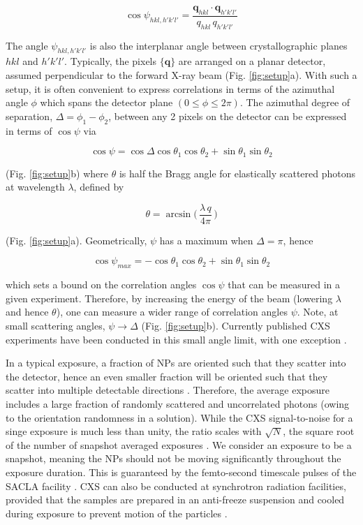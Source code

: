 \documentclass [12pt,fleqn]{article}
\def \be {\begin{equation}}
\def \ee {\end{equation}}
\begin{document}
\be \label{hklcorr}
\cos \psi_{hkl,h'k'l'}  =\frac{ \bm q_{hkl} \cdot \bm q_{h'k'l'} } {q_{hkl}\, q_{h'k'l'}} 
\ee

The angle $\psi_{hkl,h'k'l'}$ is also the interplanar angle between crystallographic planes $hkl$ and $h'k'l'$. Typically, the pixels $\{\bm q\}$ are arranged on a planar detector, assumed perpendicular to the forward X-ray beam (Fig. \ref{fig:setup}a). With such a setup, it is often convenient to express correlations in terms of the azimuthal angle $\phi$ which spans the detector plane $(0 \le \phi \le 2\pi)$. The azimuthal degree of separation, $\Delta = \phi_1  - \phi_2$, between any 2 pixels on the detector can be expressed in terms of $\cos \psi$ via

\be \label{project}
\cos \psi  = \cos  \Delta  \cos  \theta_1 \cos \theta_2 + \sin \theta_1 \sin \theta_2
\ee

(Fig. \ref{fig:setup}b) where $\theta$ is half the Bragg angle for elastically scattered photons at wavelength $\lambda$, defined by

\be
\theta  = \arcsin \big( \,\frac{ \lambda\,q  }{ 4\pi }\, \big )
\ee

(Fig. \ref{fig:setup}a). Geometrically, $\psi$ has a maximum when $\Delta=\pi$, hence

\be \label{psimax}
\cos \psi_{max} = - \cos \theta_1 \cos \theta_2  + \sin \theta_1 \sin \theta_2
\ee


which sets a bound on the correlation angles $\cos \psi$ that can be measured in a given experiment. Therefore, by increasing the energy of the beam (lowering $\lambda$ and hence $\theta$), one can measure a wider range of correlation angles $\psi$. Note, at small scattering angles, $\psi \rightarrow \Delta$ (Fig. \ref{fig:setup}b). Currently published CXS experiments have been conducted in this small angle limit, with one exception \cite{mendez2014observation}.

In a typical exposure, a fraction of NPs are oriented such that they scatter into the detector, hence an even smaller fraction will be oriented such that they scatter into multiple detectable directions \cite{mendez2014observation}. Therefore, the average exposure includes a large fraction of randomly scattered and uncorrelated photons (owing to the orientation randomness in a solution). While the CXS signal-to-noise for a singe exposure is much less than unity, the ratio scales with $\sqrt{N}$, the square root of the number of snapshot averaged exposures \cite{kirian2011signal}. We consider an exposure to be a snapshot, meaning the NPs should not be moving significantly throughout the exposure duration. This is guaranteed by the femto-second timescale pulses of the SACLA facility \cite{neutze2000potential}. CXS can also be conducted at synchrotron radiation facilities, provided that the samples are prepared in an anti-freeze suspension and cooled during exposure to prevent motion of the particles \cite{mendez2014observation, kam1981fluctuation}. 
\end{document}
